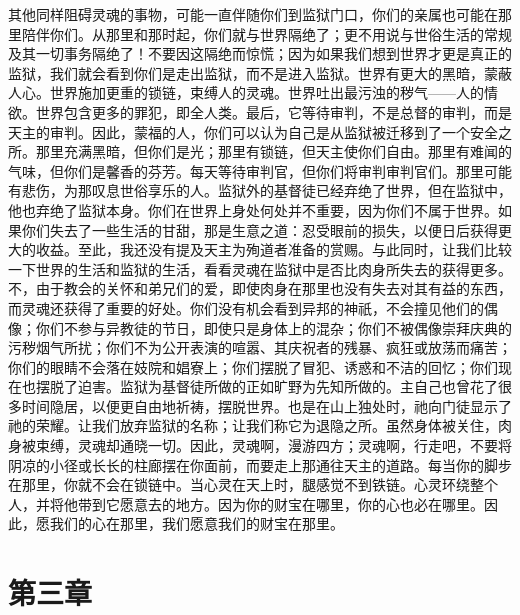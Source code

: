 其他同样阻碍灵魂的事物，可能一直伴随你们到监狱门口，你们的亲属也可能在那里陪伴你们。从那里和那时起，你们就与世界隔绝了；更不用说与世俗生活的常规及其一切事务隔绝了！不要因这隔绝而惊慌；因为如果我们想到世界才更是真正的监狱，我们就会看到你们是走出监狱，而不是进入监狱。世界有更大的黑暗，蒙蔽人心。世界施加更重的锁链，束缚人的灵魂。世界吐出最污浊的秽气——人的情欲。世界包含更多的罪犯，即全人类。最后，它等待审判，不是总督的审判，而是天主的审判。因此，蒙福的人，你们可以认为自己是从监狱被迁移到了一个安全之所。那里充满黑暗，但你们是光；那里有锁链，但天主使你们自由。那里有难闻的气味，但你们是馨香的芬芳。每天等待审判官，但你们将审判审判官们。那里可能有悲伤，为那叹息世俗享乐的人。监狱外的基督徒已经弃绝了世界，但在监狱中，他也弃绝了监狱本身。你们在世界上身处何处并不重要，因为你们不属于世界。如果你们失去了一些生活的甘甜，那是生意之道：忍受眼前的损失，以便日后获得更大的收益。至此，我还没有提及天主为殉道者准备的赏赐。与此同时，让我们比较一下世界的生活和监狱的生活，看看灵魂在监狱中是否比肉身所失去的获得更多。不，由于教会的关怀和弟兄们的爱，即使肉身在那里也没有失去对其有益的东西，而灵魂还获得了重要的好处。你们没有机会看到异邦的神祇，不会撞见他们的偶像；你们不参与异教徒的节日，即使只是身体上的混杂；你们不被偶像崇拜庆典的污秽烟气所扰；你们不为公开表演的喧嚣、其庆祝者的残暴、疯狂或放荡而痛苦；你们的眼睛不会落在妓院和娼寮上；你们摆脱了冒犯、诱惑和不洁的回忆；你们现在也摆脱了迫害。监狱为基督徒所做的正如旷野为先知所做的。主自己也曾花了很多时间隐居，以便更自由地祈祷，摆脱世界。也是在山上独处时，祂向门徒显示了祂的荣耀。让我们放弃监狱的名称；让我们称它为退隐之所。虽然身体被关住，肉身被束缚，灵魂却通晓一切。因此，灵魂啊，漫游四方；灵魂啊，行走吧，不要将阴凉的小径或长长的柱廊摆在你面前，而要走上那通往天主的道路。每当你的脚步在那里，你就不会在锁链中。当心灵在天上时，腿感觉不到铁链。心灵环绕整个人，并将他带到它愿意去的地方。因为你的财宝在哪里，你的心也必在哪里。因此，愿我们的心在那里，我们愿意我们的财宝在那里。\par


\section{第三章}

